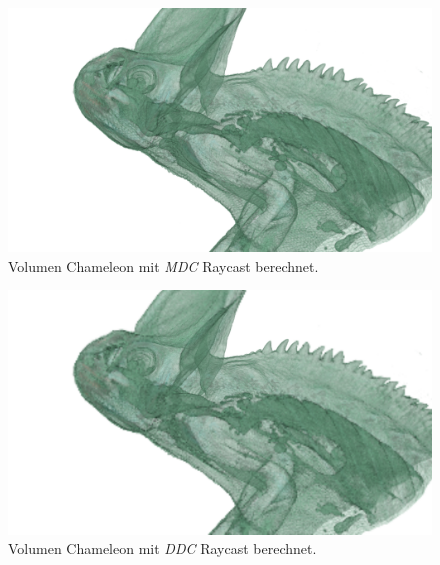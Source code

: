 \begin{landscape}
	\begin{figure}
		\centering
		\includegraphics[width=1\textheight]{../../Grafiken/results/picture_quality/chameleon/MDC_img-0-96_ray-1-5.png}
		\caption{Volumen Chameleon mit \emph{MDC} Raycast berechnet.}
		\label{fig::res::cam_mdc}
	\end{figure}
\end{landscape}

\begin{landscape}
	\begin{figure}
		\centering
		\includegraphics[width=1\textheight]{../../Grafiken/results/picture_quality/chameleon/DDC_img-1_ray-1-5.png}
		\caption{Volumen Chameleon mit \emph{DDC} Raycast berechnet.}
		\label{fig::res::cam_ddc}
	\end{figure}
\end{landscape}

